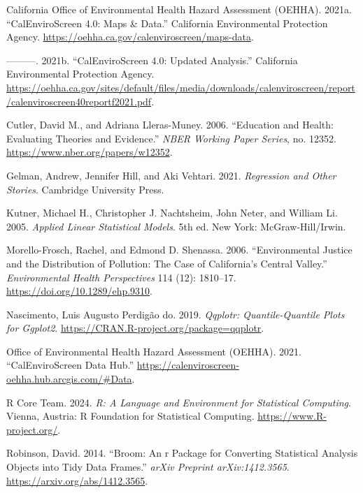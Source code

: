 \documentclass[
  letterpaper,
  DIV=11,
  numbers=noendperiod]{scrartcl}
\newlength{\cslhangindent}
\newenvironment{CSLReferences}[2] %
 {\begin{list}{}{%
  \setlength{\itemindent}{0pt}
  \setlength{\leftmargin}{0pt}
  \setlength{\parsep}{0pt}
  \ifodd #1
   \setlength{\leftmargin}{\cslhangindent}
   \setlength{\itemindent}{-1\cslhangindent}
  \fi
  \setlength{\itemsep}{#2\baselineskip}}}
 {\end{list}}
\begin{document}
\label{refs}
\begin{CSLReferences}{1}{0}
California Office of Environmental Health Hazard Assessment (OEHHA).
2021a. {``CalEnviroScreen 4.0: Maps \& Data.''} California Environmental
Protection Agency. \url{https://oehha.ca.gov/calenviroscreen/maps-data}.

---------. 2021b. {``CalEnviroScreen 4.0: Updated Analysis.''}
California Environmental Protection Agency.
\url{https://oehha.ca.gov/sites/default/files/media/downloads/calenviroscreen/report/calenviroscreen40reportf2021.pdf}.

Cutler, David M., and Adriana Lleras-Muney. 2006. {``Education and
Health: Evaluating Theories and Evidence.''} \emph{NBER Working Paper
Series}, no. 12352. \url{https://www.nber.org/papers/w12352}.

Gelman, Andrew, Jennifer Hill, and Aki Vehtari. 2021. \emph{Regression
and {Other} {Stories}}. Cambridge University Press.

Kutner, Michael H., Christopher J. Nachtsheim, John Neter, and William
Li. 2005. \emph{Applied Linear Statistical Models}. 5th ed. New York:
McGraw-Hill/Irwin.

Morello-Frosch, Rachel, and Edmond D. Shenassa. 2006. {``Environmental
Justice and the Distribution of Pollution: The Case of California's
Central Valley.''} \emph{Environmental Health Perspectives} 114 (12):
1810--17. \url{https://doi.org/10.1289/ehp.9310}.

Nascimento, Luis Augusto Perdigão do. 2019. \emph{Qqplotr:
Quantile-Quantile Plots for Ggplot2}.
\url{https://CRAN.R-project.org/package=qqplotr}.

Office of Environmental Health Hazard Assessment (OEHHA). 2021.
{``CalEnviroScreen Data Hub.''}
\url{https://calenviroscreen-oehha.hub.arcgis.com/\#Data}.

R Core Team. 2024. \emph{R: A Language and Environment for Statistical
Computing}. Vienna, Austria: R Foundation for Statistical Computing.
\url{https://www.R-project.org/}.

Robinson, David. 2014. {``Broom: An r Package for Converting Statistical
Analysis Objects into Tidy Data Frames.''} \emph{arXiv Preprint
arXiv:1412.3565}. \url{https://arxiv.org/abs/1412.3565}.


\end{CSLReferences}
\end{document}
